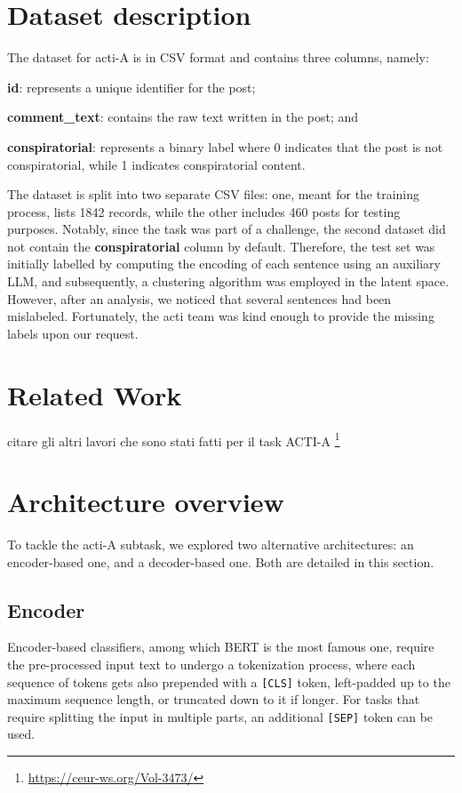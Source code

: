 \documentclass[11pt]{article}
\newcommand{\meta}[1]{{\color{blue}#1}}
\begin{document}
\section{Dataset description}\label{sec:dataset-description}
The dataset for \ac{acti}-A is in CSV format and contains three columns, namely:
\begin{enumerate*}[label=(\roman*)]
  \item \textbf{id}: represents a unique identifier for the post;
  \item \textbf{comment\_text}: contains the raw text written in the post; and
  \item \textbf{conspiratorial}: represents a binary label where 0 indicates that the post is not conspiratorial,
    while 1 indicates conspiratorial content.
\end{enumerate*}
The dataset is split into two separate CSV files: one, meant for the training process, lists
1842 records, while the other includes 460 posts for testing purposes.
%
Notably, since the task was part of a challenge, the second dataset did not contain the
\textbf{conspiratorial} column by default.
%
Therefore, the test set was initially labelled by computing the encoding of each sentence using an auxiliary LLM,
and subsequently, a clustering algorithm was employed in the latent space.
%
However, after an analysis, we noticed that several sentences had been mislabeled.
%
Fortunately, the \ac{acti} team was kind enough to provide the
missing labels upon our request.

\section{Related Work}\label{sec:related-work}

\meta{citare gli altri lavori che sono stati fatti per il task ACTI-A}\cite{russo2023actievalita2023overview} 
\footnote{\url{https://ceur-ws.org/Vol-3473/}}

\section{Architecture overview}\label{sec:architecture-overview}
To tackle the \ac{acti}-A subtask, we explored two alternative architectures: an encoder-based one, and
a decoder-based one. Both are detailed in this section.

\subsection{Encoder}
Encoder-based classifiers, among which BERT \cite{devlin-etal-2019-bert} is the most famous one, require the
pre-processed input text to undergo a tokenization process, where each sequence of tokens gets also prepended
with a \texttt{[CLS]} token, left-padded up to the maximum sequence length, or truncated down to it if longer.
For tasks that require splitting the input in multiple parts, an additional \texttt{[SEP]} token can be used.
\end{document}
